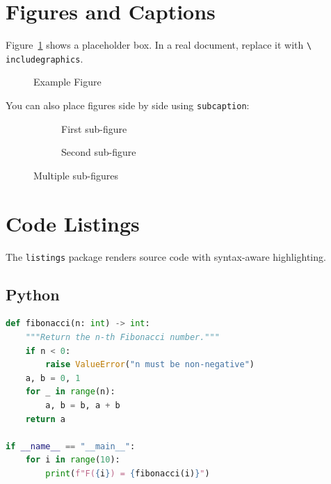 \documentclass[11pt]{article}
\theoremstyle{definition}
\theoremstyle{plain}
\begin{document}
\section{Figures and Captions}
\label{sec:figures}

Figure~\ref{fig:placeholder} shows a placeholder box.
In a real document, replace it with \texttt{\textbackslash
includegraphics}.

\begin{figure}[H]
    \centering
    \caption{Example Figure}
    \label{fig:placeholder}
\end{figure}

You can also place figures side by side using \texttt{subcaption}:

\begin{figure}[H]
    \centering
    \begin{subfigure}[b]{0.45\textwidth}
        \centering
        \caption{First sub-figure}
        \label{fig:sub:a}
    \end{subfigure}
    \hfill
    \begin{subfigure}[b]{0.45\textwidth}
        \centering
        \caption{Second sub-figure}
        \label{fig:sub:b}
    \end{subfigure}
    \caption{Multiple sub-figures}
    \label{fig:subfigures}
\end{figure}

\section{Code Listings}
\label{sec:code}

The \texttt{listings} package renders source code with syntax-aware
highlighting.

\subsection{Python}
\label{sec:code:python}

\begin{lstlisting}[language=Python, caption={A simple Python function.}]
def fibonacci(n: int) -> int:
    """Return the n-th Fibonacci number."""
    if n < 0:
        raise ValueError("n must be non-negative")
    a, b = 0, 1
    for _ in range(n):
        a, b = b, a + b
    return a

if __name__ == "__main__":
    for i in range(10):
        print(f"F({i}) = {fibonacci(i)}")
\end{lstlisting}
\end{document}
